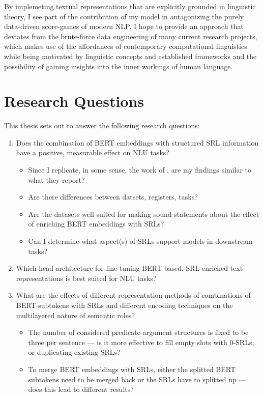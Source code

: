 By implemeting textual representations that are explicitly grounded in linguistic theory, I
see part of the contribution of my model in antagonizing the purely data-driven score-games of
modern NLP. I hope to provide an approach that deviates from the brute-force data engineering of
many current research projects, which makes use of the affordances of contemporary computational
linguistics while being motivated by linguistic concepts and established frameworks and the
possibility of gaining insights into the inner workings of human language.


\section{Research Questions}
\label{sec:research-question}

This thesis sets out to answer the following research questions:

\begin{enumerate}
  \item \label{ques:one} Does the combination of  BERT embeddings with structured SRL information have a positive,
                         measurable effect on NLU tasks?
    \begin{itemize}
      \item Since I replicate, in some sense, the work of \cite{zhang2019semantics}, are my findings similar to what they report?
      \item Are there differences between datsets, registers, tasks?
      \item Are the datasets well-suited for making sound statements about the effect of enriching BERT embeddings with SRLs?
      \item Can I determine what aspect(s) of SRLs support models in downstream tasks?
    \end{itemize}
  \item \label{ques:two} Which head architecture for fine-tuning BERT-based, SRL-enriched text representations is best suited for
                          NLU tasks?
  \item \label{ques:three} What are the effects of different representation methods of combinations of BERT-subtokens with SRLs and different encoding techniques on the multilayered nature of semantic roles?
    \begin{itemize}
      \item The number of considered predicate-argument
            structures is fixed to be three per sentence --- is it more effective to fill empty slots with
            0-SRLs, or duplicating existing SRLs?
      \item To merge BERT embeddings with SRLs, either
            the splitted BERT subtokens need to be merged back or the SRLs have to splitted up --- does
            this lead to different results?
    \end{itemize}

\end{enumerate}




